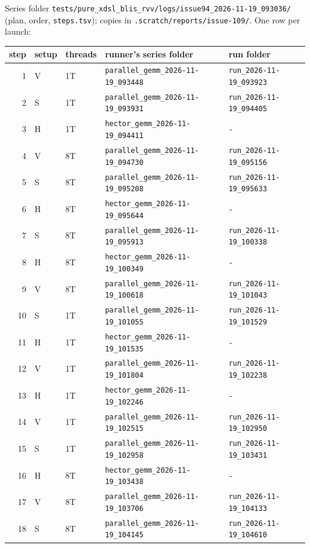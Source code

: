 Series folder \texttt{tests/pure\_xdsl\_blis\_rvv/logs/issue94\_2026-11-19\_093036/} (plan, order, \texttt{steps.tsv}); copies in \texttt{.scratch/reports/issue-109/}. One row per launch:
{\footnotesize\begin{longtable}{@{}rllll@{}}\toprule step & setup & threads & runner's series folder & run folder \\ \midrule
1 & V & 1T & \texttt{parallel\_gemm\_2026-11-19\_093448} & \texttt{run\_2026-11-19\_093923} \\
2 & S & 1T & \texttt{parallel\_gemm\_2026-11-19\_093931} & \texttt{run\_2026-11-19\_094405} \\
3 & H & 1T & \texttt{hector\_gemm\_2026-11-19\_094411} & \texttt{-} \\
4 & V & 8T & \texttt{parallel\_gemm\_2026-11-19\_094730} & \texttt{run\_2026-11-19\_095156} \\
5 & S & 8T & \texttt{parallel\_gemm\_2026-11-19\_095208} & \texttt{run\_2026-11-19\_095633} \\
6 & H & 8T & \texttt{hector\_gemm\_2026-11-19\_095644} & \texttt{-} \\
7 & S & 8T & \texttt{parallel\_gemm\_2026-11-19\_095913} & \texttt{run\_2026-11-19\_100338} \\
8 & H & 8T & \texttt{hector\_gemm\_2026-11-19\_100349} & \texttt{-} \\
9 & V & 8T & \texttt{parallel\_gemm\_2026-11-19\_100618} & \texttt{run\_2026-11-19\_101043} \\
10 & S & 1T & \texttt{parallel\_gemm\_2026-11-19\_101055} & \texttt{run\_2026-11-19\_101529} \\
11 & H & 1T & \texttt{hector\_gemm\_2026-11-19\_101535} & \texttt{-} \\
12 & V & 1T & \texttt{parallel\_gemm\_2026-11-19\_101804} & \texttt{run\_2026-11-19\_102238} \\
13 & H & 1T & \texttt{hector\_gemm\_2026-11-19\_102246} & \texttt{-} \\
14 & V & 1T & \texttt{parallel\_gemm\_2026-11-19\_102515} & \texttt{run\_2026-11-19\_102950} \\
15 & S & 1T & \texttt{parallel\_gemm\_2026-11-19\_102958} & \texttt{run\_2026-11-19\_103431} \\
16 & H & 8T & \texttt{hector\_gemm\_2026-11-19\_103438} & \texttt{-} \\
17 & V & 8T & \texttt{parallel\_gemm\_2026-11-19\_103706} & \texttt{run\_2026-11-19\_104133} \\
18 & S & 8T & \texttt{parallel\_gemm\_2026-11-19\_104145} & \texttt{run\_2026-11-19\_104610} \\
\bottomrule\end{longtable}}
